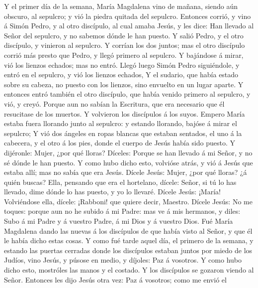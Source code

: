  Y el primer día de la semana, María Magdalena vino de
mañana, siendo aún obscuro, al sepulcro; y vió la piedra quitada del
sepulcro.  Entonces corrió, y vino á Simón Pedro, y al
otro discípulo, al cual amaba Jesús, y les dice: Han llevado al Señor
del sepulcro, y no sabemos dónde le han puesto.  Y salió
Pedro, y el otro discípulo, y vinieron al sepulcro.  Y
corrían los dos juntos; mas el otro discípulo corrió más presto que
Pedro, y llegó primero al sepulcro.  Y bajándose á mirar,
vió los lienzos echados; mas no entró.  Llegó luego Simón
Pedro siguiéndole, y entró en el sepulcro, y vió los lienzos echados,
 Y el sudario, que había estado sobre su cabeza, no puesto
con los lienzos, sino envuelto en un lugar aparte.  Y
entonces entró también el otro discípulo, que había venido primero al
sepulcro, y vió, y creyó.  Porque aun no sabían la
Escritura, que era necesario que él resucitase de los muertos.
 Y volvieron los discípulos á los suyos. 
Empero María estaba fuera llorando junto al sepulcro: y estando
llorando, bajóse á mirar el sepulcro;  Y vió dos ángeles
en ropas blancas que estaban sentados, el uno á la cabecera, y el otro á
los pies, donde el cuerpo de Jesús había sido puesto.  Y
dijéronle: Mujer, ¿por qué lloras? Díceles: Porque se han llevado á mi
Señor, y no sé dónde le han puesto.  Y como hubo dicho
esto, volvióse atrás, y vió á Jesús que estaba allí; mas no sabía que
era Jesús.  Dícele Jesús: Mujer, ¿por qué lloras? ¿á
quién buscas? Ella, pensando que era el hortelano, dícele: Señor, si tú
lo has llevado, dime dónde lo has puesto, y yo lo llevaré.
 Dícele Jesús: ¡María! Volviéndose ella, dícele:
¡Rabboni! que quiere decir, Maestro.  Dícele Jesús: No me
toques: porque aun no he subido á mi Padre: mas ve á mis hermanos, y
diles: Subo á mi Padre y á vuestro Padre, á mi Dios y á vuestro Dios.
 Fué María Magdalena dando las nuevas á los discípulos de
que había visto al Señor, y que él le había dicho estas cosas.
 Y como fué tarde aquel día, el primero de la semana, y
estando las puertas cerradas donde los discípulos estaban juntos por
miedo de los Judíos, vino Jesús, y púsose en medio, y díjoles: Paz á
vosotros.  Y como hubo dicho esto, mostróles las manos y
el costado. Y los discípulos se gozaron viendo al Señor. 
Entonces les dijo Jesús otra vez: Paz á vosotros; como me envió el
